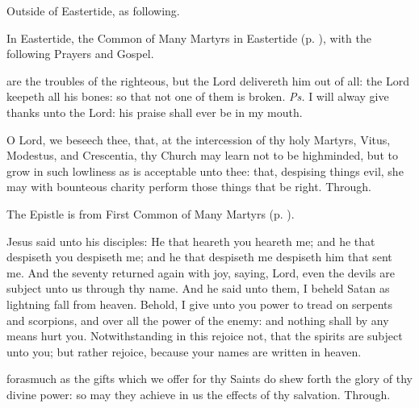 \begin{rubric}
	Outside of Eastertide, as following.
\end{rubric}

\begin{rubric}
	In Eastertide, the Common of Many Martyrs in Eastertide (p. \pageref{CommonMartyrsEaster}), with the following Prayers and Gospel.
\end{rubric}

\introit
{} are the troubles of the righteous, but the Lord delivereth him out of all: the Lord keepeth all his bones: so that not one of them is broken. \textit{Ps.} I will alway give thanks unto the Lord: his praise shall ever be in my mouth.

\collect
{} O Lord, we beseech thee, that, at the intercession of thy holy Martyrs, Vitus, Modestus, and Crescentia, thy Church may learn not to be highminded, but to grow in such lowliness as is acceptable unto thee: that, despising things evil, she may with bounteous charity perform those things that be right. Through.

\begin{rubric}
	The Epistle is from First Common of Many Martyrs (p. \pageref{Wisdom31}).
\end{rubric}


 Jesus said unto his disciples: He that heareth you heareth me; and he that despiseth you despiseth me; and he that despiseth me despiseth him that sent me. And the seventy returned again with joy, saying, Lord, even the devils are subject unto us through thy name. And he said unto them, I beheld Satan as lightning fall from heaven. Behold, I give unto you power to tread on serpents and scorpions, and over all the power of the enemy: and nothing shall by any means hurt you. Notwithstanding in this rejoice not, that the spirits are subject unto you; but rather rejoice, because your names are written in heaven.

\secret
{} forasmuch as the gifts which we offer for thy Saints do shew forth the glory of thy divine power: so may they achieve in us the effects of thy salvation. Through.

